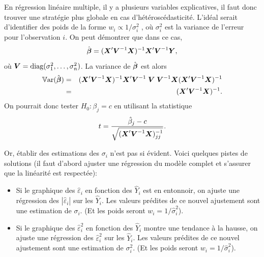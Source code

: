 En régression linéaire multiple, il y a plusieurs variables explicatives, il faut donc trouver une stratégie plus globale en cas d'hétéroscédasticité. 
L'idéal serait d'identifier des poids de la forme $w_i\propto1/\sigma^2_i \;$, où $\sigma_i^2$ est la variance de l'erreur pour l'observation $i$. On peut démontrer que dans ce cas,
$$\hat{\mbox{\boldmath$\beta$}}=(\mbox{\boldmath$X$\unboldmath}'\mbox{\boldmath$V$\unboldmath}^{-1}\mbox{\boldmath$X$\unboldmath})^{-1}\mbox{\boldmath$X$\unboldmath}'\mbox{\boldmath$V$\unboldmath}^{-1}\mbox{\boldmath$Y$\unboldmath},$$
o\`u $\mbox{\boldmath$V$\unboldmath}=\mbox{diag}(\sigma_1^2,\ldots,\sigma_n^2)$. La variance de
$\hat{\mbox{\boldmath$\beta$}}$ est alors
\begin{eqnarray*}
\mathbb{V}\text{ar}(\hat{\mbox{\boldmath$\beta$}})&=&(\mbox{\boldmath$X$\unboldmath}'\mbox{\boldmath$V$\unboldmath}^{-1}\mbox{\boldmath$X$\unboldmath})^{-1}\mbox{\boldmath$X$\unboldmath}'\mbox{\boldmath$V$\unboldmath}^{-1}\;\mbox{\boldmath$V$\unboldmath}\;\mbox{\boldmath$V$\unboldmath}^{-1}\mbox{\boldmath$X$\unboldmath}(\mbox{\boldmath$X$\unboldmath}'\mbox{\boldmath$V$\unboldmath}^{-1}\mbox{\boldmath$X$\unboldmath})^{-1}\\
&=&(\mbox{\boldmath$X$\unboldmath}'\mbox{\boldmath$V$\unboldmath}^{-1}\mbox{\boldmath$X$\unboldmath})^{-1}.
\end{eqnarray*}
On pourrait donc tester $H_0:\beta_j=c$ en utilisant la statistique
$$t={\hat{\beta}_j-c\over
\sqrt{(\mbox{\boldmath$X$\unboldmath}'\mbox{\boldmath$V$\unboldmath}^{-1}\mbox{\boldmath$X$\unboldmath})^{-1}_{jj}}}.$$ 

Or, établir des estimations des $\sigma_i$ n'est pas si évident.  Voici quelques pistes de solutions (il faut d'abord ajuster une régression du modèle complet et s'assurer que la linéarité est respectée):

\begin{itemize}
\item Si le graphique des $\hat\varepsilon_i$ en fonction des $\hat Y_i$ est en entonnoir, on ajuste une régression des $|\hat\varepsilon_i|$ sur les $\hat Y_i$. Les valeurs prédites de ce nouvel ajustement sont une estimation de $\sigma_i$. (Et les poids seront $w_i=1/\hat\sigma_i^2$).

\item Si le graphique des $\hat\varepsilon_i^2$ en fonction des $\hat Y_i$ montre une tendance à la hausse, on ajuste une régression des $\hat\varepsilon_i^2$ sur les $\hat Y_i$. Les valeurs prédites de ce nouvel ajustement sont une estimation de $\sigma_i^2$. (Et les poids seront $w_i=1/\hat\sigma_i^2$).
\end{itemize}


